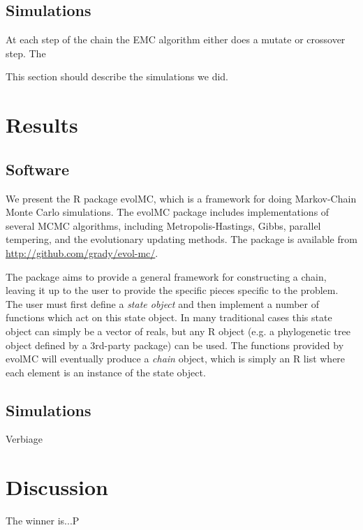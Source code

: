 \documentclass[12pt]{article}\usepackage[]{graphicx}\usepackage[]{color}
\begin{document}
\subsection{Simulations}
\label{sec:methods-simulations}

At each step of the chain the EMC algorithm either does a mutate or
crossover step. The 

This section should describe the simulations we did.

\section{Results}
\label{sec:results}

\subsection{Software}
\label{sec:software}


We present the R package evolMC, which is a framework for doing
Markov-Chain Monte Carlo simulations. The evolMC package includes
implementations of several MCMC algorithms, including
Metropolis-Hastings, Gibbs, parallel tempering, and the evolutionary
updating methods. The package is available from
\url{http://github.com/grady/evol-mc/}.

The package aims to provide a general framework for constructing a
chain, leaving it up to the user to provide the specific pieces
specific to the problem. The user must first define a \emph{state
object} and then implement a number of functions which act on this
state object. In many traditional cases this state object can simply
be a vector of reals, but any R object (e.g. a phylogenetic tree
object defined by a 3rd-party package) can be used. The functions
provided by evolMC will eventually produce a \emph{chain} object,
which is simply an R list where each element is an instance of the
state object.

\subsection{Simulations}
\label{sec:simulations}

Verbiage

\section{Discussion}
\label{sec:discussion}
The winner is...P



\end{document}

